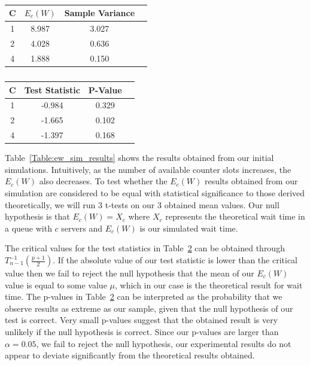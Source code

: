\documentclass{article}
\begin{document}
    \begin{table}[h!]
        \parbox{.48\linewidth}{
        \centering
        \begin{tabular}{|c | c | c | c|}
            \hline
            C & $E_c(W)$ & Sample Variance \\
            \hline\hline
            1 & 8.987 & 3.027 \\
            2 & 4.028 & 0.636 \\
            4 & 1.888 & 0.150 \\
            \hline
        \end{tabular}
        \caption{}
        \label{Table:ew_sim_results}
        }
        \parbox{.48\linewidth}{
        \centering
        \begin{tabular}{|c | c | c | c|}
            \hline
            C & Test Statistic & P-Value \\
            \hline\hline
            1 & -0.984 & 0.329 \\
            2 & -1.665 & 0.102 \\
            4 & -1.397 & 0.168 \\
            \hline
        \end{tabular}
        \caption{}
        \label{Table:ttest_results}
        }
    \end{table}

    Table~\ref{Table:ew_sim_results} shows the results obtained from our initial simulations. Intuitively, as the number of available counter slots increases, the $E_c(W)$ also decreases. To test whether the $E_c(W)$ results obtained from our simulation are considered to be equal with statistical significance to those derived theoretically, we will run 3 t-tests on our 3 obtained mean values. Our null hypothesis is that $E_c(W) = X_c$ where $X_c$ represents the theoretical wait time in a queue with $c$ servers and $E_c(W)$ is our simulated wait time.

    The critical values for the test statistics in Table~\ref{Table:ttest_results} can be obtained through $T_{n-1}^{-1}(\frac{p + 1}{2})$. If the absolute value of our test statistic is lower than the critical value then we fail to reject the null hypothesis that the mean of our $E_c(W)$ value is equal to some value $\mu$, which in our case is the theoretical result for wait time. The p-values in Table~\ref{Table:ttest_results} can be interpreted as the probability that we observe results as extreme as our sample, given that the null hypothesis of our test is correct. Very small p-values suggest that the obtained result is very unlikely if the null hypothesis is correct. Since our p-values are larger than $\alpha = 0.05$, we fail to reject the null hypothesis, our experimental results do not appear to deviate significantly from the theoretical results obtained.\\
\end{document}

